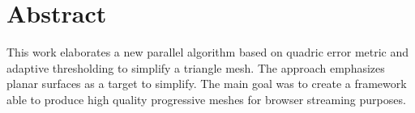 
\thispagestyle{plain}

\section*{Abstract}
This work elaborates a new parallel algorithm based on quadric error metric and adaptive thresholding to simplify a triangle mesh. The approach emphasizes planar surfaces as a target to simplify. The main goal was to create a framework able to produce high quality progressive meshes for browser streaming purposes.

\switchlanguage{\lang} %

